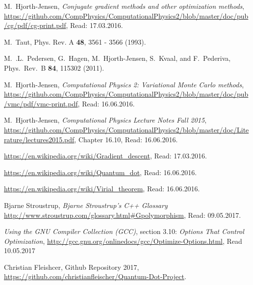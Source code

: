 \documentclass[../main.tex]{subfiles}
\begin{document}
\begin{thebibliography}{9}

 M.~Hjorth-Jensen, {\em Conjugate gradient methods and other optimization methods},  \url{https://github.com/CompPhysics/ComputationalPhysics2/blob/master/doc/pub/cg/pdf/cg-print.pdf}, Read: 17.03.2016.

 M.~Taut, Phys. Rev. A {\bf 48}, 3561 - 3566 (1993).

 M.~.L.~Pedersen, G.~Hagen, M.~Hjorth-Jensen, S.~Kvaal,  and F.~Pederiva, Phys.~Rev.~B {\bf 84}, 115302 (2011).

 M.~Hjorth-Jensen, \emph{Computational Physics 2: Variational Monte Carlo methods}, \url{https://github.com/CompPhysics/ComputationalPhysics2/blob/master/doc/pub/vmc/pdf/vmc-print.pdf}, Read: 16.06.2016.

 M.~Hjorth-Jensen, \emph{Computational Physics Lecture Notes Fall 2015},  \url{https://github.com/CompPhysics/ComputationalPhysics2/blob/master/doc/Literature/lectures2015.pdf}, Chapter 16.10, Read: 16.06.2016.

 \url{https://en.wikipedia.org/wiki/Gradient_descent}, Read: 17.03.2016.

 \url{https://en.wikipedia.org/wiki/Quantum_dot}, Read: 16.06.2016.

 \url{https://en.wikipedia.org/wiki/Virial_theorem}, Read: 16.06.2016.

 Bjarne Stroustrup, \emph{Bjarne Stroustrup's C++ Glossary} \url{http://www.stroustrup.com/glossary.html#Gpolymorphism}, Read: 09.05.2017.

 \emph{Using the GNU Compiler Collection (GCC)}, section 3.10: \emph{Options That Control Optimization}, \url{http://gcc.gnu.org/onlinedocs/gcc/Optimize-Options.html}, Read 10.05.2017

 Christian Fleishcer, Github Repository 2017,  \url{https://github.com/christianfleischer/Quantum-Dot-Project}.

\end{thebibliography}
\end{document}
